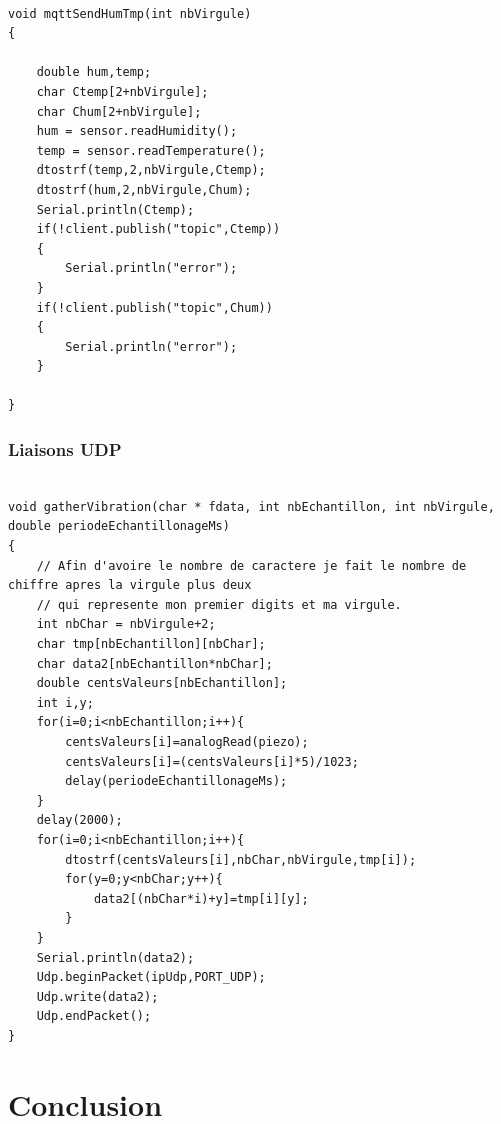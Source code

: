 \documentclass[11pt,french,a4paper]{article}
\begin{document}
\begin{scriptsize}
\begin{lstlisting}

void mqttSendHumTmp(int nbVirgule)
{

	double hum,temp;
	char Ctemp[2+nbVirgule];
	char Chum[2+nbVirgule];
	hum = sensor.readHumidity();
	temp = sensor.readTemperature();
	dtostrf(temp,2,nbVirgule,Ctemp);
	dtostrf(hum,2,nbVirgule,Chum);
	Serial.println(Ctemp);
	if(!client.publish("topic",Ctemp))
	{
		Serial.println("error");
	}
	if(!client.publish("topic",Chum))
	{
		Serial.println("error");
	}

}
\end{lstlisting}
\end{scriptsize}

\subsubsection{Liaisons UDP}

\begin{scriptsize}
\begin{lstlisting}

void gatherVibration(char * fdata, int nbEchantillon, int nbVirgule, double periodeEchantillonageMs)
{
	// Afin d'avoire le nombre de caractere je fait le nombre de chiffre apres la virgule plus deux
	// qui represente mon premier digits et ma virgule.
	int nbChar = nbVirgule+2;
	char tmp[nbEchantillon][nbChar];
	char data2[nbEchantillon*nbChar];
	double centsValeurs[nbEchantillon];
	int i,y;
	for(i=0;i<nbEchantillon;i++){
		centsValeurs[i]=analogRead(piezo);
		centsValeurs[i]=(centsValeurs[i]*5)/1023;
		delay(periodeEchantillonageMs);
	}
	delay(2000);
	for(i=0;i<nbEchantillon;i++){
		dtostrf(centsValeurs[i],nbChar,nbVirgule,tmp[i]);
		for(y=0;y<nbChar;y++){
			data2[(nbChar*i)+y]=tmp[i][y];
		}	
	}
	Serial.println(data2);
	Udp.beginPacket(ipUdp,PORT_UDP);
	Udp.write(data2);
	Udp.endPacket();
}

\end{lstlisting}
\end{scriptsize}

\section{Conclusion}

\newpage
\listoffigures
\end{document}

